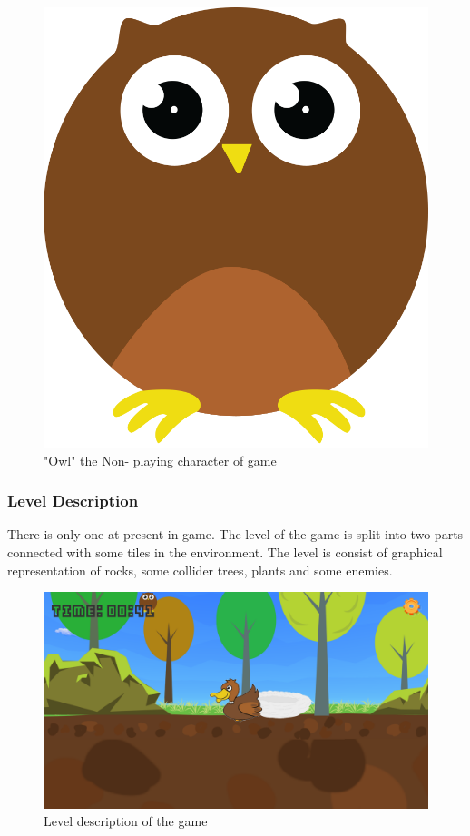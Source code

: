 \documentclass[12pt]{article}
\begin{document}
\begin{figure}[H]
    \centering
    \includegraphics[scale=0.7]{owl.png}
    \caption{"Owl" the Non- playing character of game}
    \label{fig:Owl}
\end{figure}


\subsubsection{Level Description}

There is only one at present in-game. The level of the game is split into two parts connected with some tiles in the environment. The level is consist of graphical representation of rocks, some collider trees, plants and some enemies. 

\begin{figure}[H]
\centering
\includegraphics[scale=0.17]{level.png}
\caption{Level description of the game}
\label{leveldescription}
\end{figure}
\end{document}
